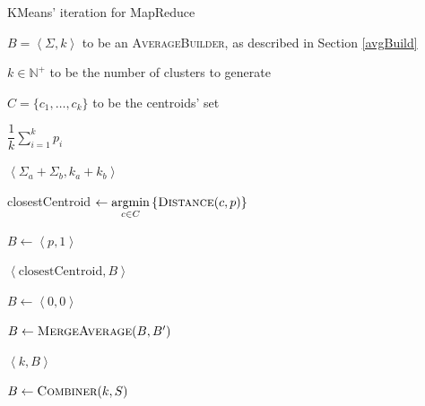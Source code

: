 \documentclass[parskip=full]{report}
\begin{document}
\begin{algorithm}
	\caption{KMeans' iteration for MapReduce}
	\label{algo:kmeans-reducer}
	\begin{algorithmic}[1]
		\Require $B = \left\langle \Sigma, k\right\rangle$ to be an 
		\textsc{AverageBuilder}, as described in Section \ref{avgBuild}
		
		\Require $k \in \mathbb{N}^+$ to be the number of clusters to generate
		
		\Require $C = \{c_1, \dots, c_k\}$ to be the centroids' set
		
		 
		\State \Return $\dfrac{1}{k}\sum_{i = 1}^{k} p_i$
		\EndProcedure
		
		\vspace{.25cm}
		
		 
		\State \Return $\left\langle \Sigma_a + \Sigma_b, k_a + 
		k_b\right\rangle$
		\EndProcedure
		
		\vspace{.25cm}
		
		
		\State closestCentroid $\gets \underset{c \in C}{\mathrm{argmin}} 
		\left\{\Call{Distance}{c, p}\right\}$ 
		
		\State $B \gets \left\langle p, 1\right\rangle$ 
		
		\State \Return $\left\langle \text{closestCentroid}, B\right\rangle$
		
		\EndProcedure
		
		\vspace{.25cm}
		
		\State $B \gets \left\langle 0,0 \right\rangle$
		
		\State $B \gets \Call{MergeAverage}{B, B'}$
		\EndFor
		
		\State \Return $\left\langle k, B\right\rangle$
		\EndProcedure
		
		\vspace{.25cm}
		
		\State $B \gets \Call{Combiner}{k,S}$
		\State \Return {}
		\EndProcedure
	\end{algorithmic}
\end{algorithm}
\end{document}
